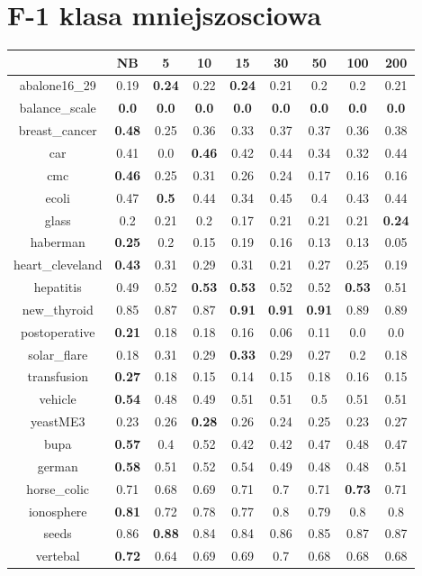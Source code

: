 \documentclass{article}%
\begin{document}
%
\section*{F{-}1 klasa mniejszosciowa}%
\begin{tabular}{c|cccccccc}%
\hline%
&NB&5&10&15&30&50&100&200\\%
\hline%
abalone16\_29&0.19&\textbf{0.24}&0.22&\textbf{0.24}&0.21&0.2&0.2&0.21\\%
\hline%
balance\_scale&\textbf{0.0}&\textbf{0.0}&\textbf{0.0}&\textbf{0.0}&\textbf{0.0}&\textbf{0.0}&\textbf{0.0}&\textbf{0.0}\\%
\hline%
breast\_cancer&\textbf{0.48}&0.25&0.36&0.33&0.37&0.37&0.36&0.38\\%
\hline%
car&0.41&0.0&\textbf{0.46}&0.42&0.44&0.34&0.32&0.44\\%
\hline%
cmc&\textbf{0.46}&0.25&0.31&0.26&0.24&0.17&0.16&0.16\\%
\hline%
ecoli&0.47&\textbf{0.5}&0.44&0.34&0.45&0.4&0.43&0.44\\%
\hline%
glass&0.2&0.21&0.2&0.17&0.21&0.21&0.21&\textbf{0.24}\\%
\hline%
haberman&\textbf{0.25}&0.2&0.15&0.19&0.16&0.13&0.13&0.05\\%
\hline%
heart\_cleveland&\textbf{0.43}&0.31&0.29&0.31&0.21&0.27&0.25&0.19\\%
\hline%
hepatitis&0.49&0.52&\textbf{0.53}&\textbf{0.53}&0.52&0.52&\textbf{0.53}&0.51\\%
\hline%
new\_thyroid&0.85&0.87&0.87&\textbf{0.91}&\textbf{0.91}&\textbf{0.91}&0.89&0.89\\%
\hline%
postoperative&\textbf{0.21}&0.18&0.18&0.16&0.06&0.11&0.0&0.0\\%
\hline%
solar\_flare&0.18&0.31&0.29&\textbf{0.33}&0.29&0.27&0.2&0.18\\%
\hline%
transfusion&\textbf{0.27}&0.18&0.15&0.14&0.15&0.18&0.16&0.15\\%
\hline%
vehicle&\textbf{0.54}&0.48&0.49&0.51&0.51&0.5&0.51&0.51\\%
\hline%
yeastME3&0.23&0.26&\textbf{0.28}&0.26&0.24&0.25&0.23&0.27\\%
\hline%
bupa&\textbf{0.57}&0.4&0.52&0.42&0.42&0.47&0.48&0.47\\%
\hline%
german&\textbf{0.58}&0.51&0.52&0.54&0.49&0.48&0.48&0.51\\%
\hline%
horse\_colic&0.71&0.68&0.69&0.71&0.7&0.71&\textbf{0.73}&0.71\\%
\hline%
ionosphere&\textbf{0.81}&0.72&0.78&0.77&0.8&0.79&0.8&0.8\\%
\hline%
seeds&0.86&\textbf{0.88}&0.84&0.84&0.86&0.85&0.87&0.87\\%
\hline%
vertebal&\textbf{0.72}&0.64&0.69&0.69&0.7&0.68&0.68&0.68\\%
\hline%
\end{tabular}
\end{document}
